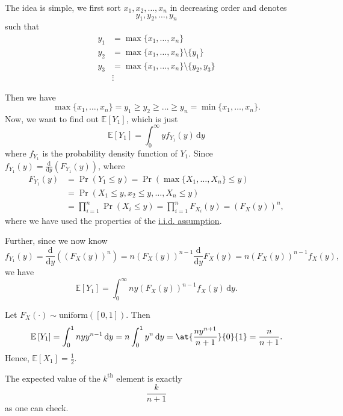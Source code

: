 The idea is simple, we first sort \(x_1, x_2, \ldots , x_n\) in decreasing order and denotes
\[
	y_1, y_2, \ldots , y_{n}
\]
such that
\[
	\begin{split}
		y_1 &= \max\{x_1, \ldots , x_n\}\\
		y_2 &= \max\{x_1, \ldots , x_n\}\setminus \{y_1\}\\
		y_3 &= \max\{x_1, \ldots , x_n\}\setminus \{y_2, y_3\}\\
		&\vdots
	\end{split}
\]

Then we have
\[
	\max\{x_1, \ldots , x_n\} = y_1\geq y_2\geq \ldots \geq y_n = \min\{x_1, \ldots , x_{n}\}.
\]
Now, we want to find out \(\mathbb{E}\left[Y_1 \right]\), which is just
\[
	\mathbb{E}\left[Y_1 \right] = \int_0^{\infty } y f_{Y_1}(y)\,\mathrm{d}y
\]
where \(f_{Y_1}\) is the probability density function of \(Y_1\). Since \(f_{Y_1}(y) = \frac{\mathrm{d}}{\mathrm{d}y} \left(F_{Y_1}(y)\right)\),
where
\[
	\begin{split}
		F_{Y_1}(y) &= \Pr(Y_1\leq y)
		= \Pr(\max\{X_1, \ldots , X_{n}\}\leq y)\\
		&= \Pr(X_1\leq y,x_2\leq y, \ldots , X_n\leq y)\\
		&= \prod\limits_{i=1}^{n} \Pr(X_{i}\leq y)
		= \prod\limits_{i=1}^{n} F_{X_{i}}(y)
		= \left(F_X(y)\right)^n,
	\end{split}
\]
where we have used the properties of the \hyperref[def:i.i.d.]{i.i.d. assumption}.

Further, since we now know
\[
	f_{Y_1}(y) = \frac{\mathrm{d}}{\mathrm{d}y}\left(\left(F_X(y)\right)^n\right) = n \left(F_X(y)\right)^{n-1} \frac{\mathrm{d}}{\mathrm{d}y} F_X(y) = n\left(F_X (y)\right)^{n-1}f_X(y),
\]
we have
\[
	\mathbb{E}\left[Y_1 \right] = \int_0^{\infty }n y \left(F_{X}(y)\right)^{n-1} f_X(y)\,\mathrm{d}y.
\]

\begin{eg}
	Let \(F_{X}(\cdot)\sim \mathrm{uniform}([0,1]) \). Then
	\[
		\mathbb{E}\left[Y_1 \right] = \int_0^1 n y y^{n-1}\,\mathrm{d}y = n\int_0^1 y^n \,\mathrm{d}y = \at{\frac{ny^{n+1}}{n+1}}{0}{1} = \frac{n}{n+1} .
	\]
	Hence, \(\mathbb{E}\left[X_1 \right] = \frac{1}{2} \).
	\begin{remark}
		The expected value of the \(k^{\mathrm{th}}\) element is exactly
		\[
			\frac{k}{n+1}
		\]
		as one can check.
	\end{remark}
\end{eg}


